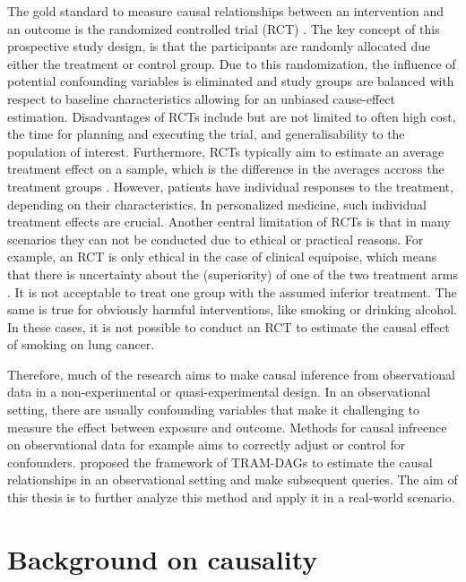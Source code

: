 The gold standard to measure causal relationships between an intervention and an outcome is the randomized controlled trial (RCT) \citep{hariton2018}. The key concept of this prospective study design, is that the participants are randomly allocated due either the treatment or control group. Due to this randomization, the influence of potential confounding variables is eliminated and study groups are balanced with respect to baseline characteristics allowing for an unbiased cause-effect estimation.
Disadvantages of RCTs include but are not limited to often high cost, the time for planning and executing the trial, and generalisability to the population of interest. %
Furthermore, RCTs typically aim to estimate an average treatment effect on a sample, which is the difference in the averages accross the treatment groups \citep{nichols2007}. However, patients have individual responses to the treatment, depending on their characteristics. In personalized medicine, such individual treatment effects are crucial.
Another central limitation of RCTs is that in many scenarios they can not be conducted due to ethical or practical reasons. For example, an RCT is only ethical in the case of clinical equipoise, which means that there is uncertainty about the (superiority) of one of the two treatment arms \citep{freedman1987}. It is not acceptable to treat one group with the assumed inferior treatment. The same is true for obviously harmful interventions, like smoking or drinking alcohol. In these cases, it is not possible to conduct an RCT to estimate the causal effect of smoking on lung cancer.

Therefore, much of the research aims to make causal inference from observational data in a non-experimental or quasi-experimental design. In an observational setting, there are usually confounding variables that make it challenging to measure the effect between exposure and outcome. Methods for causal infreence on observational data for example aims to correctly adjust or control for confounders. \citet{sick2025} proposed the framework of TRAM-DAGs to estimate the causal relationships in an observational setting and make subsequent queries. The aim of this thesis is to further analyze this method and apply it in a real-world scenario.


\section{Background on causality}

